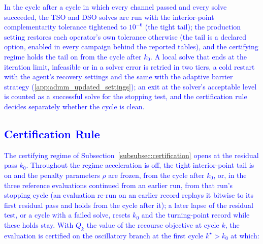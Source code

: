 \documentclass[preprint,12pt]{elsarticle}
\begin{document}
\textcolor{blue}{
    In the cycle after a cycle in which every channel passed and every solve succeeded, the TSO and DSO solves are run with the interior-point complementarity tolerance tightened to $10^{-6}$ (the tight tail); the production setting restores each operator's own tolerance otherwise (the tail is a declared option, enabled in every campaign behind the reported tables), and the certifying regime holds the tail on from the cycle after $k_0$. A local solve that ends at the iteration limit, infeasible or in a solver error is retried in two tiers, a cold restart with the agent's recovery settings and the same with the adaptive barrier strategy (\ref{app:admm_updated_settings}); an exit at the solver's acceptable level is counted as a successful solve for the stopping test, and the certification rule decides separately whether the cycle is clean.
}

\subsection{\textcolor{blue}{Certification Rule}}
\label{app:admm_updated_certification}

\textcolor{blue}{
    The certifying regime of Subsection~\ref{subsubsec:certification} opens at the residual pass $k_0$. Throughout the regime acceleration is off, the tight interior-point tail is on and the penalty parameters $\rho$ are frozen, from the cycle after $k_0$, or, in the three reference evaluations continued from an earlier run, from that run's stopping cycle (an evaluation re-run on an earlier record replays it bitwise to its first residual pass and holds from the cycle after it);
    a later lapse of the residual test, or a cycle with a failed solve, resets $k_0$ and the turning-point record while these holds stay. With $Q_k$ the value of the recourse objective at cycle $k$, the evaluation is certified on the oscillatory branch at the first cycle $k^{\star} > k_0$ at which:
}
\end{document}
